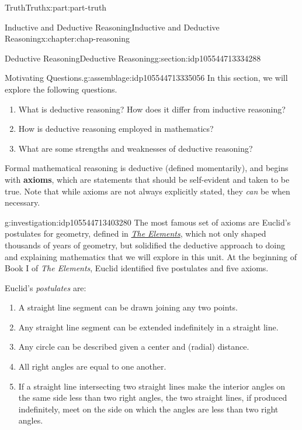 \documentclass[oneside,10pt,]{book}
\newcommand{\terminology}[1]{\textbf{#1}}
\numberwithin{equation}{section}
\begin{document}
\begin{partptx}{Truth}{}{Truth}{}{}{x:part:part-truth}
\begin{chapterptx}{Inductive and Deductive Reasoning}{}{Inductive and Deductive Reasoning}{}{}{x:chapter:chap-reasoning}
%
%
\typeout{************************************************}
\typeout{************************************************}
%
\begin{sectionptx}{Deductive Reasoning}{}{Deductive Reasoning}{}{}{g:section:idp105544713334288}
\begin{assemblage}{Motivating Questions.}{g:assemblage:idp105544713335056}%
In this section, we will explore the following questions. %
\begin{enumerate}
\item{}What is deductive reasoning? How does it differ from inductive reasoning?%
\item{}How is deductive reasoning employed in mathematics?%
\item{}What are some strengths and weaknesses of deductive reasoning?%
\end{enumerate}
%
\end{assemblage}
Formal mathematical reasoning is deductive (defined momentarily), and begins with \terminology{axioms}, which are statements that should be self-evident and taken to be true. Note that while axioms are not always explicitly stated, they \emph{can} be when necessary.%
\begin{investigation}{}{g:investigation:idp105544713403280}%
The most famous set of axioms are Euclid's postulates for geometry, defined in \emph{\href{https://en.wikipedia.org/wiki/Euclid's_Elements}{The Elements}\footnotemark{}}, which not only shaped thousands of years of geometry, but solidified the deductive approach to doing and explaining mathematics that we will explore in this unit. At the beginning of Book I of \emph{The Elements}, Euclid identified five postulates and five axioms.%
\par
Euclid's \emph{postulates} are:%
%
\begin{enumerate}
\item{}A straight line segment can be drawn joining any two points.%
\item{}Any straight line segment can be extended indefinitely in a straight line.%
\item{}Any circle can be described given a center and (radial) distance.%
\item{}All right angles are equal to one another.%
\item{}If a straight line intersecting two straight lines make the interior angles on the same side less than two right angles, the two straight lines, if produced indefinitely, meet on the side on which the angles are less than two right angles.%

\end{enumerate}
\end{investigation}
\end{sectionptx}
\end{chapterptx}
\end{partptx}
\end{document}
